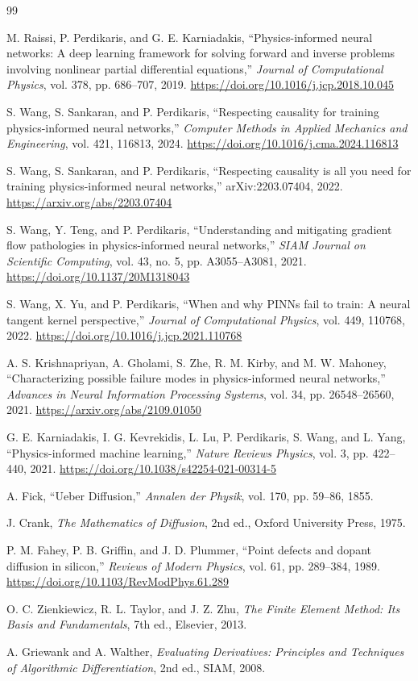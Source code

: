 \documentclass[11pt]{article}
\begin{document}
\begin{thebibliography}{99}

M. Raissi, P. Perdikaris, and G. E. Karniadakis,
``Physics-informed neural networks: A deep learning framework for solving forward and inverse problems involving nonlinear partial differential equations,''
\emph{Journal of Computational Physics}, vol. 378, pp. 686--707, 2019.
\url{https://doi.org/10.1016/j.jcp.2018.10.045}

S. Wang, S. Sankaran, and P. Perdikaris,
``Respecting causality for training physics-informed neural networks,''
\emph{Computer Methods in Applied Mechanics and Engineering}, vol. 421, 116813, 2024.
\url{https://doi.org/10.1016/j.cma.2024.116813}

S. Wang, S. Sankaran, and P. Perdikaris,
``Respecting causality is all you need for training physics-informed neural networks,''
arXiv:2203.07404, 2022.
\url{https://arxiv.org/abs/2203.07404}

S. Wang, Y. Teng, and P. Perdikaris,
``Understanding and mitigating gradient flow pathologies in physics-informed neural networks,''
\emph{SIAM Journal on Scientific Computing}, vol. 43, no. 5, pp. A3055--A3081, 2021.
\url{https://doi.org/10.1137/20M1318043}

S. Wang, X. Yu, and P. Perdikaris,
``When and why PINNs fail to train: A neural tangent kernel perspective,''
\emph{Journal of Computational Physics}, vol. 449, 110768, 2022.
\url{https://doi.org/10.1016/j.jcp.2021.110768}

A. S. Krishnapriyan, A. Gholami, S. Zhe, R. M. Kirby, and M. W. Mahoney,
``Characterizing possible failure modes in physics-informed neural networks,''
\emph{Advances in Neural Information Processing Systems}, vol. 34, pp. 26548--26560, 2021.
\url{https://arxiv.org/abs/2109.01050}

G. E. Karniadakis, I. G. Kevrekidis, L. Lu, P. Perdikaris, S. Wang, and L. Yang,
``Physics-informed machine learning,''
\emph{Nature Reviews Physics}, vol. 3, pp. 422--440, 2021.
\url{https://doi.org/10.1038/s42254-021-00314-5}

A. Fick,
``Ueber Diffusion,''
\emph{Annalen der Physik}, vol. 170, pp. 59--86, 1855.

J. Crank,
\emph{The Mathematics of Diffusion}, 2nd ed.,
Oxford University Press, 1975.

P. M. Fahey, P. B. Griffin, and J. D. Plummer,
``Point defects and dopant diffusion in silicon,''
\emph{Reviews of Modern Physics}, vol. 61, pp. 289--384, 1989.
\url{https://doi.org/10.1103/RevModPhys.61.289}

O. C. Zienkiewicz, R. L. Taylor, and J. Z. Zhu,
\emph{The Finite Element Method: Its Basis and Fundamentals}, 7th ed.,
Elsevier, 2013.

A. Griewank and A. Walther,
\emph{Evaluating Derivatives: Principles and Techniques of Algorithmic Differentiation}, 2nd ed.,
SIAM, 2008.

\end{thebibliography}
\end{document}

